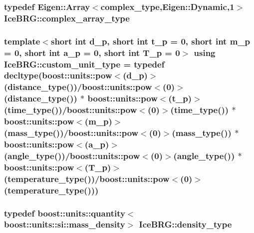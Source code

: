 \subsubsection[{complex\+\_\+array\+\_\+type}]{\setlength{\rightskip}{0pt plus 5cm}typedef Eigen\+::\+Array$<${\bf complex\+\_\+type},Eigen\+::\+Dynamic,1$>$ {\bf Ice\+B\+R\+G\+::complex\+\_\+array\+\_\+type}}\label{namespaceIceBRG_a02e79930ea75411b7883d2786b2fc5d7}
\hypertarget{namespaceIceBRG_a896bc1bf7e8db5ca045b9cf35912ca5e}{}
\subsubsection[{custom\+\_\+unit\+\_\+type}]{\setlength{\rightskip}{0pt plus 5cm}template$<$short int d\+\_\+p, short int t\+\_\+p = 0, short int m\+\_\+p = 0, short int a\+\_\+p = 0, short int T\+\_\+p = 0$>$ using {\bf Ice\+B\+R\+G\+::custom\+\_\+unit\+\_\+type} = typedef decltype(boost\+::units\+::pow$<$(d\+\_\+p)$>$({\bf distance\+\_\+type}())/boost\+::units\+::pow$<$(0)$>$({\bf distance\+\_\+type}()) $\ast$ boost\+::units\+::pow$<$(t\+\_\+p)$>$({\bf time\+\_\+type}())/boost\+::units\+::pow$<$(0)$>$({\bf time\+\_\+type}()) $\ast$ boost\+::units\+::pow$<$(m\+\_\+p)$>$({\bf mass\+\_\+type}())/boost\+::units\+::pow$<$(0)$>$({\bf mass\+\_\+type}()) $\ast$ boost\+::units\+::pow$<$(a\+\_\+p)$>$({\bf angle\+\_\+type}())/boost\+::units\+::pow$<$(0)$>$({\bf angle\+\_\+type}()) $\ast$ boost\+::units\+::pow$<$(T\+\_\+p)$>$({\bf temperature\+\_\+type}())/boost\+::units\+::pow$<$(0)$>$({\bf temperature\+\_\+type}()))}\label{namespaceIceBRG_a896bc1bf7e8db5ca045b9cf35912ca5e}
\hypertarget{namespaceIceBRG_a9f5e5cdd641bb4c06f7305dfb5ae0238}{}
\subsubsection[{density\+\_\+type}]{\setlength{\rightskip}{0pt plus 5cm}typedef boost\+::units\+::quantity$<$boost\+::units\+::si\+::mass\+\_\+density$>$ {\bf Ice\+B\+R\+G\+::density\+\_\+type}}\label{namespaceIceBRG_a9f5e5cdd641bb4c06f7305dfb5ae0238}
\hypertarget{namespaceIceBRG_a9ae604a735e60597c32674c8cd07706f}{}
